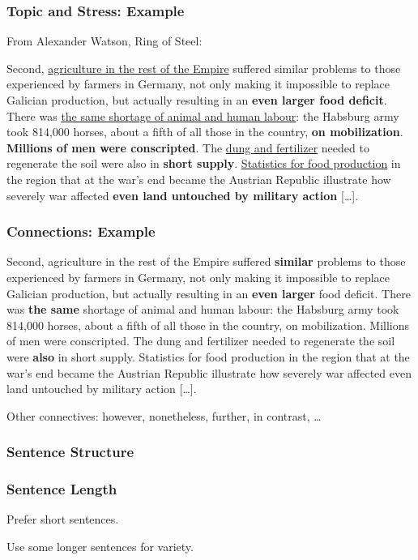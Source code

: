 \documentclass[xetex]{beamer}
\begin{document}
\begin{frame}
  \frametitle{Topic and Stress: Example}

  From Alexander Watson, Ring of Steel:

  \medskip

  \small
  Second, \underline{agriculture in the rest of the Empire} suffered similar problems to those experienced by farmers in Germany, not only making it impossible to replace Galician production, but actually resulting in an \textbf{even larger food deficit}.
  There was \underline{the same shortage of animal and human labour}: the Habsburg army took 814,000 horses, about a fifth of all those in the country, \textbf{on mobilization}.
  \textbf{Millions of men were conscripted}.
  The \underline{dung and fertilizer} needed to regenerate the soil were also in \textbf{short supply}.
  \underline{Statistics for food production} in the region that at the war's end became the Austrian Republic illustrate how severely war affected \textbf{even land untouched by military action} [\dots].
\end{frame}

\begin{frame}
  \frametitle{Connections: Example}

  {
  \small
  Second, agriculture in the rest of the Empire suffered \textbf{similar} problems to those experienced by farmers in Germany, not only making it impossible to replace Galician production, but actually resulting in an \textbf{even larger} food deficit.
  There was \textbf{the same} shortage of animal and human labour: the Habsburg army took 814,000 horses, about a fifth of all those in the country, on mobilization.
  Millions of men were conscripted.
  The dung and fertilizer needed to regenerate the soil were \textbf{also} in short supply.
  Statistics for food production in the region that at the war's end became the Austrian Republic illustrate how severely war affected even land untouched by military action [\dots].
  }

  \medskip

  Other connectives: however, nonetheless, further, in contrast, \dots
\end{frame}

\subsubsection{Sentence Structure}

\begin{frame}
  \frametitle{Sentence Length}

  Prefer short sentences.

  \medskip

  Use some longer sentences for variety.
\end{frame}
\end{document}
